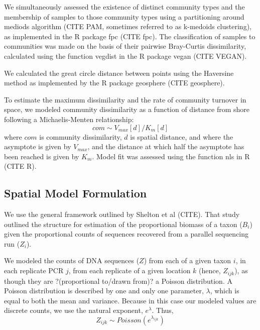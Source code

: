 \documentclass[11pt,letterpaper]{article} %
\begin{document}
We simultaneously assessed the existence of distinct community types and the membership of samples to those community types using a partitioning around mediods algorithm (CITE PAM, sometimes referred to as k-medoids clustering), as implemented in the R package fpc (CITE fpc).
The classification of samples to communities was made on the basis of their pairwise Bray-Curtis dissimilarity, calculated using the function vegdist in the R package vegan (CITE VEGAN). %

We calculated the great circle distance between points using the Haversine method as implemented by the R package geosphere (CITE geosphere).

To estimate the maximum dissimilarity and the rate of community turnover in space, we modeled community dissimilarity as a function of distance from shore following a Michaelis-Menten relationship:
\begin{equation}\label{MichaelisMenten}
	com \sim V_{max}[d]/K_{m}[d]
\end{equation}
where $com$ is community dissimilarity, $d$ is spatial distance, and where the asymptote is given by $V_{max}$, and the distance at which half the asymptote has been reached is given by $K_{m}$. 
Model fit was assessed using the function nls in R (CITE R). 




\subsection*{Spatial Model Formulation}
We use the general framework outlined by Shelton et al (CITE).
That study outlined the structure for estimation of the proportional biomass of a taxon ($B_i$) given the proportional counts of sequences recovered from a parallel sequencing run ($Z_i$).

We modeled the counts of DNA sequences ($Z$) from each of a given taxon $i$, in each replicate PCR $j$, from each replicate of a given location $k$ (hence, $Z_{ijk}$), as though they are ?(proportional to/drawn from)? a Poisson distribution. A Poisson distribution is described by one and only one parameter, $\lambda$, which is equal to both the mean and variance. Because in this case our modeled values are discrete counts, we use the natural exponent, $e^\lambda$. %
Thus,
\begin{equation}\label{some_cool_eqn_name}
	Z_{ijk} \sim Poisson(e^{\lambda_{ijk}})
\end{equation}
\end{document}
